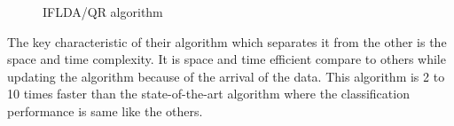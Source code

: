 \begin{figure}[htbp]
	\centering
	
	
	\caption{IFLDA/QR algorithm }
	\label{fig:labelOfIFLDA}
\end{figure}
The key characteristic of their algorithm which separates it from the other is the space and time complexity. It is space and time efficient compare to others while updating the algorithm because of the arrival of the data. This algorithm is 2 to 10 times faster than the state-of-the-art algorithm where the classification performance is same like the others.
